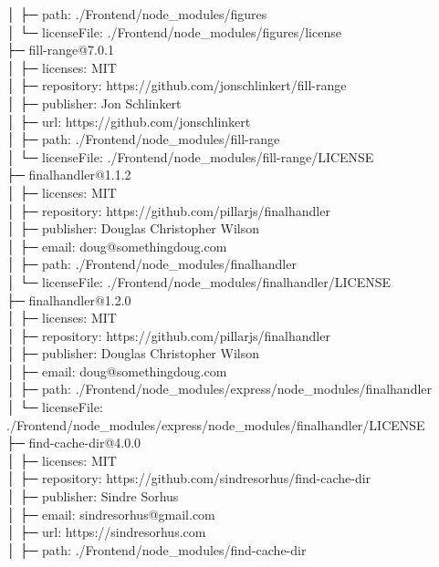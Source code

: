 \documentclass[
    paper=a4,
    twoside=false,
    parskip=half,
    listof=entryprefix,
    listof=totoc,
    index=totoc,
    bibliography=totoc,
    headsepline,
]{scrbook}
\begin{document}
    │  ├─ path: ./Frontend/node\_modules/figures\\
    │  └─ licenseFile: ./Frontend/node\_modules/figures/license\\
    ├─ fill-range@7.0.1\\
    │  ├─ licenses: MIT\\
    │  ├─ repository: https://github.com/jonschlinkert/fill-range\\
    │  ├─ publisher: Jon Schlinkert\\
    │  ├─ url: https://github.com/jonschlinkert\\
    │  ├─ path: ./Frontend/node\_modules/fill-range\\
    │  └─ licenseFile: ./Frontend/node\_modules/fill-range/LICENSE\\
    ├─ finalhandler@1.1.2\\
    │  ├─ licenses: MIT\\
    │  ├─ repository: https://github.com/pillarjs/finalhandler\\
    │  ├─ publisher: Douglas Christopher Wilson\\
    │  ├─ email: doug@somethingdoug.com\\
    │  ├─ path: ./Frontend/node\_modules/finalhandler\\
    │  └─ licenseFile: ./Frontend/node\_modules/finalhandler/LICENSE\\
    ├─ finalhandler@1.2.0\\
    │  ├─ licenses: MIT\\
    │  ├─ repository: https://github.com/pillarjs/finalhandler\\
    │  ├─ publisher: Douglas Christopher Wilson\\
    │  ├─ email: doug@somethingdoug.com\\
    │  ├─ path: ./Frontend/node\_modules/express/node\_modules/finalhandler\\
    │  └─ licenseFile: ./Frontend/node\_modules/express/node\_modules/finalhandler/LICENSE\\
    ├─ find-cache-dir@4.0.0\\
    │  ├─ licenses: MIT\\
    │  ├─ repository: https://github.com/sindresorhus/find-cache-dir\\
    │  ├─ publisher: Sindre Sorhus\\
    │  ├─ email: sindresorhus@gmail.com\\
    │  ├─ url: https://sindresorhus.com\\
    │  ├─ path: ./Frontend/node\_modules/find-cache-dir\\
\end{document}

